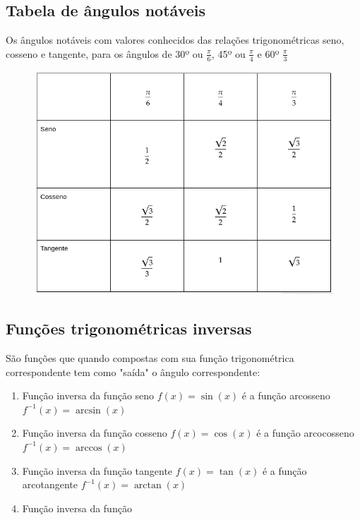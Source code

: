 \begin{multicols*}{2}
    \subsection*{Tabela de ângulos notáveis}
    Os ângulos notáveis com valores conhecidos das relações trigonométricas seno, cosseno e tangente, para os ângulos de 30º ou $\frac{\pi}{6}$, 45º ou $\frac{\pi}{4}$ e 60º $\frac{\pi}{3}$
    \begin{figure}[H]
        \includegraphics[scale=0.38]{assets/rafael/img36.png}
    \end{figure}
    
    \subsection*{Funções trigonométricas inversas}
    
    São funções que quando compostas com sua função trigonométrica correspondente tem como "saída" o ângulo correspondente:
    \begin{enumerate}
    \item Função inversa da função seno $f(x) = \sin(x)$ é a função arcosseno $f^{-1}(x) = \arcsin(x)$
    \item Função inversa da função cosseno $f(x) = \cos(x)$ é a função arcocosseno 
    $f^{-1}(x) = \arccos(x)$
    \item Função inversa da função tangente $f(x) = \tan(x)$ é a função arcotangente 
    $f^{-1}(x) = \arctan(x)$
    \item Função inversa da função 
    \end{enumerate}
    

\end{multicols*}
